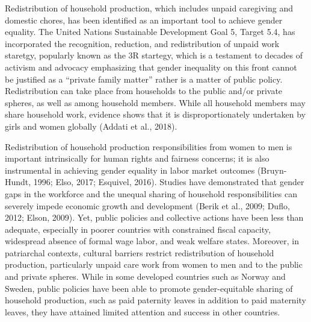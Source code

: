 \documentclass[
  11pt,
]{article}
\begin{document}
Redistribution of household production, which includes unpaid caregiving
and domestic chores, has been identified as an important tool to achieve
gender equality. The United Nations Sustainable Development Goal 5,
Target 5.4, has incorporated the recognition, reduction, and
redistribution of unpaid work staretgy, popularly known as the 3R
startegy, which is a testament to decades of activism and advocacy
emphasizing that gender inequality on this front cannot be justified as
a ``private family matter'' rather is a matter of public policy.
Redistribution can take place from households to the public and/or
private spheres, as well as among household members. While all household
members may share household work, evidence shows that it is
disproportionately undertaken by girls and women globally (Addati et
al., 2018).

Redistribution of household production responsibilities from women to
men is important intrinsically for human rights and fairness concerns;
it is also instrumental in achieving gender equality in labor market
outcomes (Bruyn-Hundt, 1996; Elso, 2017; Esquivel, 2016). Studies have
demonstrated that gender gaps in the workforce and the unequal sharing
of household responsibilities can severely impede economic growth and
development (Berik et al., 2009; Duflo, 2012; Elson, 2009). Yet, public
policies and collective actions have been less than adequate, especially
in poorer countries with constrained fiscal capacity, widespread absence
of formal wage labor, and weak welfare states. Moreover, in patriarchal
contexts, cultural barriers restrict redistribution of household
production, particularly unpaid care work from women to men and to the
public and private spheres. While in some developed countries such as
Norway and Sweden, public policies have been able to promote
gender-equitable sharing of household production, such as paid paternity
leaves in addition to paid maternity leaves, they have attained limited
attention and success in other countries.
\end{document}

